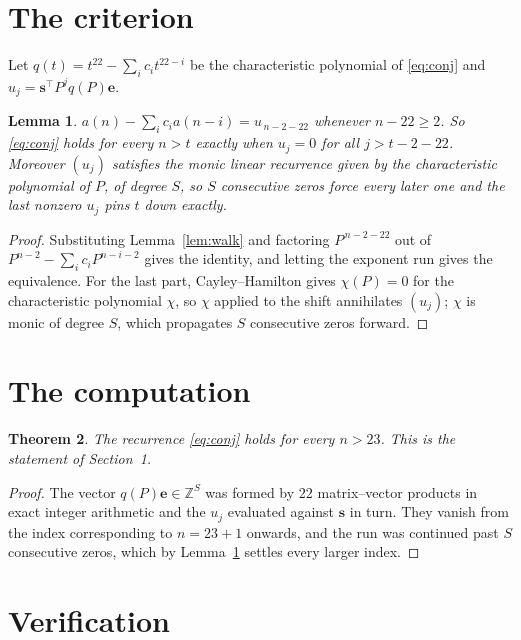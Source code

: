 \documentclass[11pt,a4paper]{article}
\theoremstyle{plain}
\newtheorem{theorem}{Theorem}
\newtheorem{lemma}[theorem]{Lemma}
\theoremstyle{definition}
\begin{document}
\section{The criterion}

Let $q(t)=t^{22}-\sum_i c_i t^{22-i}$ be the characteristic polynomial of
\eqref{eq:conj} and $u_j=\mathbf{s}^{\!\top}P^{j}q(P)\mathbf{e}$.

\begin{lemma}\label{lem:crit}
$a(n)-\sum_i c_i a(n-i)=u_{\,n-2-22}$ whenever $n-22\ge2$. So \eqref{eq:conj}
holds for every $n>t$ exactly when $u_j=0$ for all $j>t-2-22$. Moreover $(u_j)$
satisfies the monic linear recurrence given by the characteristic polynomial of $P$, of
degree $S$, so $S$ consecutive zeros force every later one and the last nonzero $u_j$ pins
$t$ down exactly.
\end{lemma}

\begin{proof}
Substituting Lemma~\ref{lem:walk} and factoring $P^{\,n-2-22}$ out of
$P^{n-2}-\sum_i c_i P^{n-i-2}$ gives the identity, and letting the exponent run gives the
equivalence. For the last part, Cayley--Hamilton gives $\chi(P)=0$ for the characteristic
polynomial $\chi$, so $\chi$ applied to the shift annihilates $(u_j)$; $\chi$ is monic of
degree $S$, which propagates $S$ consecutive zeros forward.
\end{proof}

\section{The computation}

\begin{theorem}
The recurrence \eqref{eq:conj} holds for every $n>23$. This is the statement of
Section~1.
\end{theorem}

\begin{proof}
The vector $q(P)\mathbf{e}\in\mathbb{Z}^{S}$ was formed by $22$ matrix--vector
products in exact integer arithmetic and the $u_j$ evaluated against $\mathbf{s}$ in turn.
They vanish from the index corresponding to $n=23+1$ onwards, and the run was continued
past $S$ consecutive zeros, which by Lemma~\ref{lem:crit} settles every larger index.
\end{proof}

\section{Verification}
\end{document}
